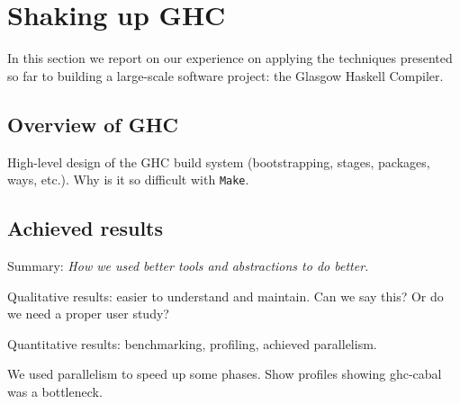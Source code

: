 \section{Shaking up GHC\label{section-shaking-up-ghc}}

In this section we report on our experience on applying the techniques presented
so far to building a large-scale software project: the Glasgow Haskell Compiler.

\subsection{Overview of GHC}

High-level design of the GHC build system (bootstrapping, stages,
packages, ways, etc.). Why is it so difficult with \texttt{Make}.

\subsection{Achieved results}

Summary: \emph{How we used better tools and abstractions to do better.}

Qualitative results: easier to understand and maintain. Can we say this? Or do
we need a proper user study?

Quantitative results: benchmarking, profiling, achieved parallelism. 

We used parallelism to speed up some phases. Show profiles showing ghc-cabal was a bottleneck.
